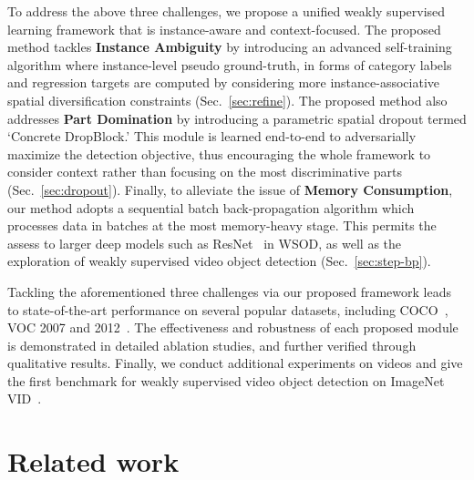 \documentclass[10pt,twocolumn,letterpaper]{article}
\begin{document}
To address the above three challenges, we propose a unified weakly supervised learning framework that is instance-aware and context-focused. The proposed method tackles \textbf{{Instance Ambiguity}} by introducing an advanced self-training algorithm where instance-level pseudo ground-truth, in forms of category labels and regression targets are computed by considering more instance-associative spatial diversification constraints (Sec.~\ref{sec:refine}). The proposed method also addresses \textbf{Part Domination} by introducing a parametric spatial dropout termed `Concrete DropBlock.' This module is learned end-to-end to adversarially maximize the detection objective, thus encouraging the whole framework to consider context rather than focusing on the most discriminative parts (Sec.~\ref{sec:dropout}). Finally, to alleviate the issue of \textbf{{Memory Consumption}}, our method adopts a sequential batch back-propagation algorithm which processes data in batches at the most memory-heavy stage. This permits the assess to larger deep models such as ResNet~\cite{resnet} in WSOD, as well as the exploration of weakly supervised video object detection (Sec.~\ref{sec:step-bp}).

Tackling the aforementioned three challenges via our proposed framework leads to state-of-the-art performance on several popular datasets, including COCO~\cite{coco}, VOC 2007 and 2012~\cite{pascal}. The effectiveness and robustness of each proposed module is demonstrated in detailed ablation studies, and further verified through qualitative results. Finally, we conduct additional experiments on videos and give the first benchmark for weakly supervised video object detection on ImageNet VID~\cite{imagenet}. 






 

\section{Related work}
\label{related}
\end{document}

